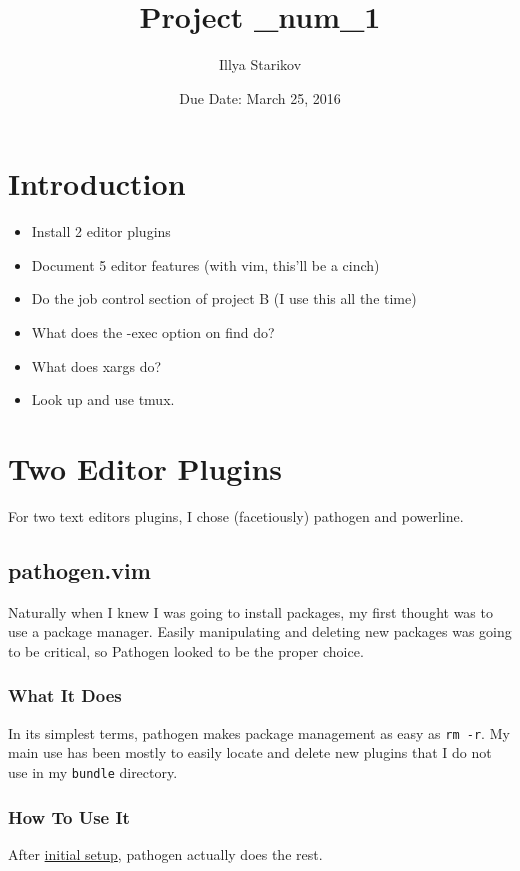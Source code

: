 \documentclass{article}
\title{Project \_num_1}
\author{Illya Starikov}
\date{Due Date: March 25, 2016}
\newcommand{\shellcmd}[1]{\texttt{\colorbox{gray!30}{#1}}}
\begin{document}
\maketitle

\setcounter{section}{-1}

\section{Introduction}
\begin{itemize}
    \item Install 2 editor plugins
    \item Document 5 editor features (with vim, this'll be a cinch)
    \item Do the job control section of project B (I use this all the time)
    \item What does the -exec option on find do?
    \item What does xargs do?
    \item Look up and use tmux.
\end{itemize}

\section{Two Editor Plugins}
For two text editors plugins, I chose (facetiously) pathogen and powerline.

\subsection{pathogen.vim}
Naturally when I knew I was going to install packages, my first thought was to use a package manager. Easily manipulating and deleting new packages was going to be critical, so Pathogen looked to be the proper choice.

\subsubsection{What It Does}
In its simplest terms, pathogen makes package management as easy as \shellcmd{rm -r}. My main use has been mostly to easily locate and delete new plugins that I do not use in my \texttt{bundle} directory.

\subsubsection{How To Use It}
After \href{https://github.com/tpope/vim-pathogen#runtime-path-manipulation}{initial setup}, pathogen actually does the rest.
\end{document}
